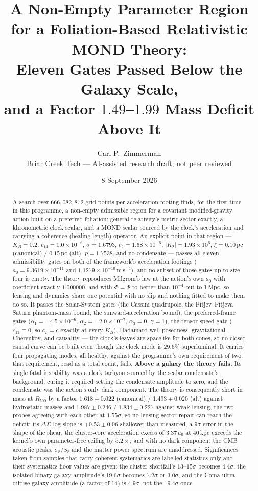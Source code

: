 \documentclass[11pt,letterpaper]{article}
\title{A Non-Empty Parameter Region for a Foliation-Based Relativistic MOND Theory:\\ Eleven Gates Passed Below the Galaxy Scale,\\ and a Factor $1.49$--$1.99$ Mass Deficit Above It}
\author{Carl P.\ Zimmerman\\ \small Briar Creek Tech --- AI-assisted research draft; not peer reviewed}
\date{8 September 2026}
\newcommand{\ms}{\,\mathrm{m\,s^{-2}}}
\begin{document}
\maketitle
\begin{abstract}
A search over $666{,}082{,}872$ grid points per acceleration footing finds, for the first time in this programme, a non-empty admissible region for a covariant modified-gravity action built on a preferred foliation: general relativity's metric sector exactly, a khronometric clock scalar, and a MOND scalar sourced by the clock's acceleration and carrying a coherence (healing-length) operator. An explicit point in that region --- $K_B=0.2$, $c_{14}=1.0\times10^{-6}$, $\sigma=1.6793$, $c_2=1.68\times10^{-6}$, $|K_2|=1.93\times10^{6}$, $\xi=0.10$\,pc (canonical) / $0.15$\,pc (alt), $p=1.7538$, and no condensate --- passes all eleven admissibility gates on both of the framework's acceleration footings ($a_0=9.3619\times10^{-11}$ and $1.1279\times10^{-10}\ms$), and no subset of those gates up to size four is empty. The theory reproduces Milgrom's law at the action's own $a_0$ with coefficient exactly $1.000000$, and with $\Phi=\Psi$ to better than $10^{-4}$ out to 1\,Mpc, so lensing and dynamics share one potential with no slip and nothing fitted to make them do so. It passes the Solar-System gates (the Cassini quadrupole, the Pitjev--Pitjeva Saturn phantom-mass bound, the sunward-acceleration bound), the preferred-frame gates ($\alpha_1=-4.5\times10^{-6}$, $\alpha_2=-2.0\times10^{-7}$, $\alpha_3=0$, $\gamma=1$), the tensor-speed gate ($c_{13}\equiv0$, so $c_T=c$ exactly at every $K_B$), Hadamard well-posedness, gravitational Cherenkov, and causality --- the clock's leaves are spacelike for both cones, so no closed causal curve can be built even though the clock mode is $29.6\%$ superluminal. It carries four propagating modes, all healthy, against the programme's own requirement of two; that requirement, read as a total count, fails. \textbf{Above a galaxy the theory fails.} Its single fatal instability was a clock tachyon sourced by the scalar condensate's background; curing it required setting the condensate amplitude to zero, and the condensate was the action's only dark component. The theory is consequently short in mass at $R_{500}$ by a factor $1.618\pm0.022$ (canonical) / $1.493\pm0.020$ (alt) against hydrostatic masses and $1.987\pm0.246$ / $1.834\pm0.227$ against weak lensing, the two probes agreeing with each other at $1.55\sigma$, so no lensing-sector repair can reach the deficit; its $\Delta\Sigma$ log-slope is $+0.53\pm0.06$ shallower than measured, a $9\sigma$ error in the shape of the shear; the cluster-core acceleration excess of $3.37\,a_0$ at 40\,kpc exceeds the kernel's own parameter-free ceiling by $5.2\times$; and with no dark component the CMB acoustic peaks, $\sigma_8$/$S_8$ and the matter power spectrum are unaddressed. Significances taken from samples that carry coherent systematics are labelled statistics-only and their systematics-floor values are given: the cluster shortfall's $13$--$15\sigma$ becomes $4.4\sigma$, the isolated binary-galaxy amplitude's $19.6\sigma$ becomes $7.2\sigma$ or $3.0\sigma$, and the Coma ultra-diffuse-galaxy amplitude (a factor of 14) is $4.9\sigma$, not the $19.4\sigma$ once 
\end{abstract}
\end{document}
